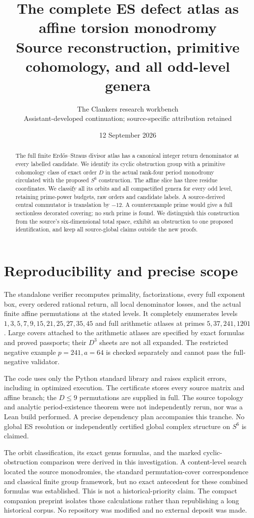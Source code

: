 \documentclass[11pt]{article}
\title{The complete ES defect atlas as affine torsion monodromy\\
Source reconstruction, primitive cohomology, and all odd-level genera}
\author{The Clankers research workbench\\\small Assistant-developed continuation; source-specific attribution retained}
\date{12 September 2026}
\theoremstyle{definition}\newtheorem{definition}[theorem]{Definition}
\begin{document}
\maketitle
\begin{abstract}
The full finite Erd\H{o}s--Straus divisor atlas has a canonical integer
return denominator at every labelled candidate. We identify its cyclic
obstruction group with a primitive cohomology class of exact order $D$
in the actual rank-four period monodromy circulated with the proposed
$S^6$ construction. The affine slice has three residue coordinates.
We classify all its orbits and all compactified genera for every odd
level, retaining prime-power budgets, raw orders and candidate labels.
A source-derived central commutator is translation by $-12$.
A counterexample prime would give a full sectionless decorated covering;
no such prime is found. We distinguish this construction from the source's
six-dimensional total space, exhibit an obstruction to one proposed
identification, and keep all source-global claims outside the new proofs.
\end{abstract}
\tableofcontents



\section{Reproducibility and precise scope}
The standalone verifier recomputes primality, factorizations, every full
exponent box, every ordered rational return, all local denominator losses,
and the actual finite affine permutations at the stated levels.
It completely enumerates levels $1,3,5,7,9,15,21,25,27,35,45$ and full
arithmetic atlases at primes $5,37,241,1201$.
Large covers attached to the arithmetic atlases are specified by exact
formulas and proved passports; their $D^3$ sheets are not all expanded.
The restricted negative example $p=241,a=64$ is checked separately and
cannot pass the full-negative validator.

The code uses only the Python standard library and raises explicit errors,
including in optimized execution. The certificate stores every source
matrix and affine branch; the $D\le9$ permutations are supplied in full.
The source topology and analytic period-existence theorem were not
independently rerun, nor was a Lean build performed. A precise dependency
plan accompanies this tranche. No global ES resolution or independently
certified global complex structure on $S^6$ is claimed.

The orbit classification, its exact genus formulas, and the marked
cyclic-obstruction comparison were derived in this investigation. A
content-level search located the source monodromies, the standard
permutation-cover correspondence and classical finite group framework,
but no exact antecedent for these combined formulas was established.
This is not a historical-priority claim. The compact companion preprint
isolates those calculations rather than republishing a long historical
corpus. No repository was modified and no external deposit was made.

\end{document}
